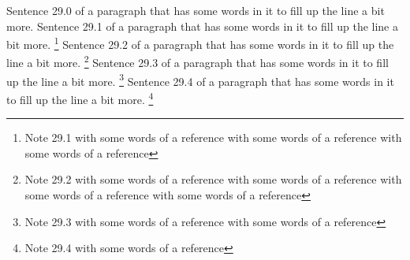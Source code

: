 Sentence 29.0 of a paragraph that has some words in it to fill up the line a bit more. Sentence 29.1 of a paragraph that has some words in it to fill up the line a bit more. \footnote{Note 29.1 with some words of a reference with some words of a reference with some words of a reference} Sentence 29.2 of a paragraph that has some words in it to fill up the line a bit more. \footnote{Note 29.2 with some words of a reference with some words of a reference with some words of a reference with some words of a reference} Sentence 29.3 of a paragraph that has some words in it to fill up the line a bit more. \footnote{Note 29.3 with some words of a reference with some words of a reference} Sentence 29.4 of a paragraph that has some words in it to fill up the line a bit more. \footnote{Note 29.4 with some words of a reference}


